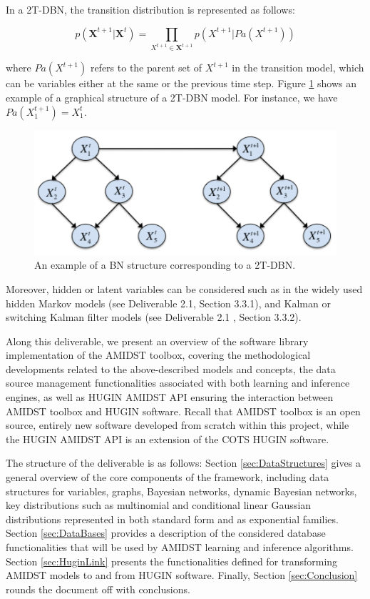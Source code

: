 In a 2T-DBN, the transition distribution is represented as follows:

$$ p(\mathbf{X}^{t+1} |\mathbf{X}^t) = \prod_{X^{t+1}\in \mathbf{X}^{t+1}} p(X^{t+1}|Pa(X^{t+1}))$$ 

\noindent where $Pa(X^{t+1})$ refers to the parent set of $X^{t+1}$ in the transition model, which can be variables either at the same or the previous time step. Figure \ref{Figure:ExampleDBN} shows an example of a graphical structure of a 2T-DBN model. For instance, we have $Pa(X_1^{t+1}) = X_1^{t}$. 

\begin{figure}[ht!]
\begin{center}
\includegraphics[scale=0.6]{./figures/ExampleDBN}
\caption{\label{Figure:ExampleDBN}An example of a BN structure corresponding to a 2T-DBN.}
\end{center}
\end{figure}

Moreover, hidden or latent variables can be considered such as in the widely used hidden Markov models (see Deliverable 2.1\cite{Deliverable2.1}, Section 3.3.1), and Kalman or switching Kalman filter models (see Deliverable 2.1 \cite{Deliverable2.1}, Section 3.3.2).


Along this deliverable, we present an overview of the software library implementation of the AMIDST toolbox, covering the methodological developments related to the above-described models and concepts, the data source management functionalities associated with both learning and inference engines, as well as HUGIN AMIDST API ensuring the interaction between AMIDST toolbox and HUGIN software. Recall that AMIDST toolbox is an open source, entirely new software developed from scratch within this project, while the HUGIN AMIDST API is an extension of the COTS HUGIN software.

The structure of the deliverable is as follows: Section \ref{sec:DataStructures} gives a general overview of the core components of the framework, including data structures for variables, graphs, Bayesian networks, dynamic Bayesian networks, key distributions such as multinomial and conditional linear Gaussian distributions represented in both standard form and as exponential families. Section \ref{sec:DataBases} provides a description of the considered database functionalities that will be used by AMIDST learning and inference algorithms. Section \ref{sec:HuginLink} presents the functionalities defined for transforming AMIDST models to and from HUGIN software. Finally, Section \ref{sec:Conclusion} rounds the document off with conclusions.